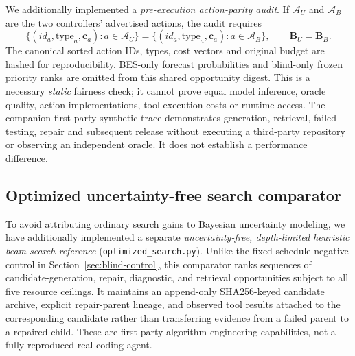 \documentclass[pdflatex,sn-basic]{sn-jnl}
\begin{document}
We additionally implemented a \emph{pre-execution
action-parity audit}. If $\mathcal A_U$ and
$\mathcal A_B$ are the two controllers'
advertised actions, the audit requires
\begin{equation}
 \bigl\{(id_a,\mathrm{type}_a,
       \mathbf c_a):a\in\mathcal A_U\bigr\}
 =\bigl\{(id_a,\mathrm{type}_a,
       \mathbf c_a):a\in\mathcal A_B\bigr\},
 \qquad \mathbf B_U=\mathbf B_B .
 \label{eq:action-parity}
\end{equation}
The canonical sorted action IDs, types,
cost vectors and original budget are
hashed for reproducibility. BES-only
forecast probabilities and blind-only
frozen priority ranks are omitted from
this shared opportunity digest. This is
a necessary \emph{static} fairness check;
it cannot prove equal model inference,
oracle quality, action implementations,
tool execution costs or runtime access.
The companion first-party synthetic trace
demonstrates generation, retrieval,
failed testing, repair and subsequent
release without executing a third-party
repository or observing an independent
oracle. It does not establish a performance
difference.

\subsection{Optimized uncertainty-free search comparator}
\label{sec:optimized-search}

To avoid attributing ordinary search gains to Bayesian uncertainty
modeling, we have additionally implemented a separate
\emph{uncertainty-free, depth-limited heuristic beam-search reference}
(\texttt{optimized\_search.py}). Unlike the fixed-schedule negative
control in Section~\ref{sec:blind-control}, this comparator ranks
sequences of candidate-generation, repair, diagnostic, and retrieval
opportunities subject to all five resource ceilings. It maintains
an append-only SHA256-keyed candidate archive, explicit repair-parent
lineage, and observed tool results attached to the corresponding
candidate rather than transferring evidence from a failed parent
to a repaired child. These are first-party algorithm-engineering
capabilities, not a fully reproduced real coding agent.
\end{document}
